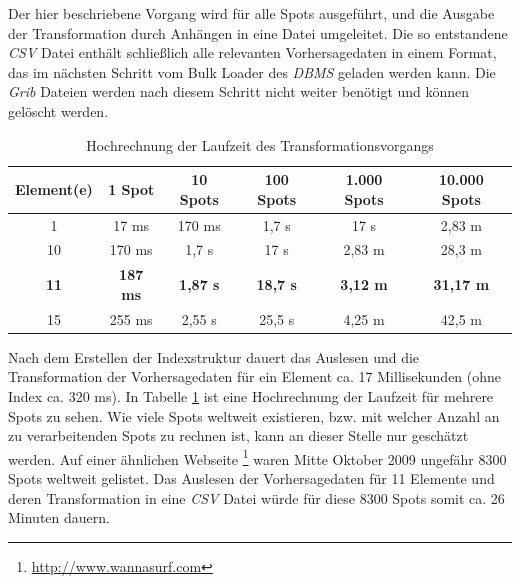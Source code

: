 

Der hier beschriebene Vorgang wird für alle Spots ausgeführt, und die
Ausgabe der Transformation durch Anhängen in eine Datei
umgeleitet. Die so entstandene \textit{CSV} Datei enthält schließlich
alle relevanten Vorhersagedaten in einem Format, das im nächsten
Schritt vom Bulk Loader des \textit{DBMS} geladen werden kann. Die
\textit{Grib} Dateien werden nach diesem Schritt nicht weiter benötigt
und können gelöscht werden.
\begin{table}[h]
  \centering
  {\sf
    \footnotesize
    \begin{longtable}{c|c|c|c|c|c}

      \toprule
      \textbf{Element(e)} & \textbf{1 Spot} & \textbf{10 Spots} & \textbf{100 Spots} & \textbf{1.000 Spots} & \textbf{10.000 Spots} \\
      \midrule
      1 & 17 ms & 170 ms & 1,7 s & 17 s & 2,83 m \\
      10 & 170 ms & 1,7 s & 17 s & 2,83 m & 28,3 m \\
      \textbf{11} & \textbf{187 ms} &  \textbf{1,87 s} & \textbf{18,7 s} & \textbf{3,12 m} & \textbf{31,17 m} \\
      15 & 255 ms & 2,55 s & 25,5 s & 4,25 m & 42,5 m \\
      \bottomrule
    \end{longtable}
  }

  \caption{Hochrechnung der Laufzeit des Transformationsvorgangs}
  \label{tab:transformation_laufzeit}

\end{table}

Nach dem Erstellen der Indexstruktur dauert das Auslesen und die
Transformation der Vorhersagedaten für ein Element ca. 17
Millisekunden (ohne Index ca. 320 ms). In Tabelle
\ref{tab:transformation_laufzeit} ist eine Hochrechnung der Laufzeit
für mehrere Spots zu sehen. Wie viele Spots weltweit existieren,
bzw. mit welcher Anzahl an zu verarbeitenden Spots zu rechnen ist,
kann an dieser Stelle nur geschätzt werden. Auf einer ähnlichen
Webseite \footnote{\url{http://www.wannasurf.com}} waren Mitte Oktober
2009 ungefähr 8300 Spots weltweit gelistet. Das Auslesen der
Vorhersagedaten für 11 Elemente und deren Transformation in eine
\textit{CSV} Datei würde für diese 8300 Spots somit ca. 26 Minuten
dauern.

